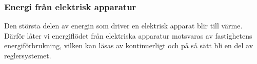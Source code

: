 \subsubsection{Energi från elektrisk apparatur}
Den största delen av energin som driver en elektrisk apparat blir till värme. Därför låter vi energiflödet från elektriska apparatur motsvaras av fastighetens energiförbrukning, vilken kan läsas av kontinuerligt och på så sätt bli en del av reglersystemet.

